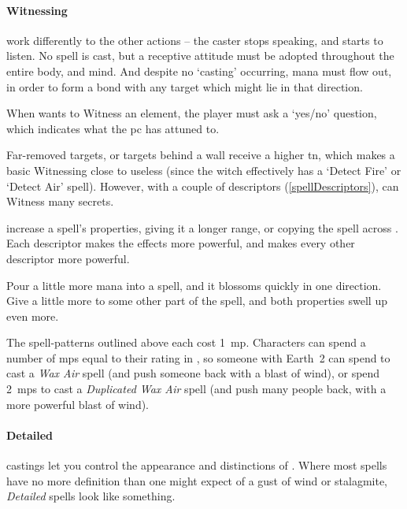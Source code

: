 \begin{multicols}{2}
\paragraph{Witnessing}
work differently to the other actions -- the caster stops speaking, and starts to listen.
No spell is cast, but a receptive attitude must be adopted throughout the entire body, and mind.
And despite no `casting' occurring, mana must flow out, in order to form a bond with any target which might lie in that direction.

When  wants to Witness an element, the player must ask a `yes/no' question, which indicates what the \gls{pc} has attuned to.

Far-removed targets, or targets behind a wall receive a higher \gls{tn}, which makes a basic Witnessing close to useless (since the witch effectively has a `Detect Fire' or `Detect Air' spell).
However, with a couple of \glspl{descriptor} (\vref{spellDescriptors}),  can Witness many secrets.

\label{spellDescriptors}
increase a spell's properties, giving it a longer range, or copying the spell across .
Each \gls{descriptor} makes the effects more powerful, and makes every other \gls{descriptor} more powerful.

Pour a little more mana into a spell, and it blossoms quickly in one direction.
Give a little more to some other part of the spell, and both properties swell up even more.

The spell-patterns outlined above each cost 1~\gls{mp}.
Characters can spend a number of \glspl{mp} equal to their rating in , so someone with Earth~2 can spend  to cast a \textit{Wax Air} spell (and push someone back with a blast of wind), or spend 2~\glspl{mp} to cast a \textit{Duplicated Wax Air} spell (and push many people back, with a more powerful blast of wind).

\paragraph{Detailed}
\glspl{casting} let you control the appearance and distinctions of .
Where most \glspl{spell} have no more definition than one might expect of a gust of wind or stalagmite, \textit{Detailed} spells look like something.


\end{multicols}
